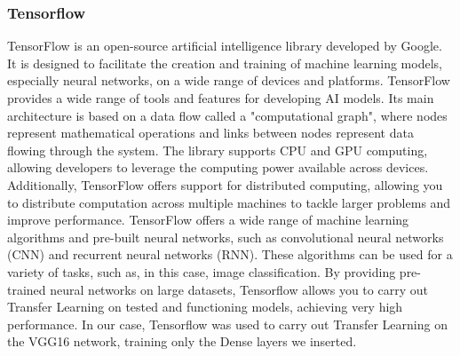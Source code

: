 \documentclass[a4paper,11pt]{report}
\theoremstyle{definition}
\theoremstyle{plain}
\begin{document}
            \subsubsection{Tensorflow}
                TensorFlow is an open-source artificial intelligence library developed by Google. It is designed to facilitate the creation and training of machine learning models, especially neural networks, on a wide range of devices and platforms.\newline
                TensorFlow provides a wide range of tools and features for developing AI models. Its main architecture is based on a data flow called a "computational graph", where nodes represent mathematical operations and links between nodes represent data flowing through the system.\newline
                The library supports CPU and GPU computing, allowing developers to leverage the computing power available across devices. Additionally, TensorFlow offers support for distributed computing, allowing you to distribute computation across multiple machines to tackle larger problems and improve performance.\newline
                TensorFlow offers a wide range of machine learning algorithms and pre-built neural networks, such as convolutional neural networks (CNN) and recurrent neural networks (RNN). These algorithms can be used for a variety of tasks, such as, in this case, image classification. By providing pre-trained neural networks on large datasets, Tensorflow allows you to carry out Transfer Learning on tested and functioning models, achieving very high performance. In our case, Tensorflow was used to carry out Transfer Learning on the VGG16 network, training only the Dense layers we inserted.
\end{document}
